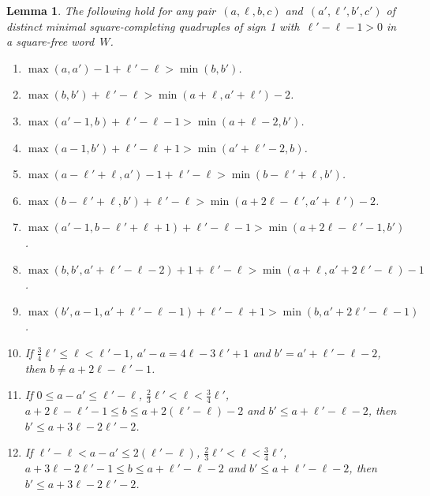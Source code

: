 \documentclass[12pt]{article}
\theoremstyle{plain}
\newtheorem{lemma}[theorem]{Lemma}
\theoremstyle{definition}
\begin{document}
	\begin{lemma} \label{lem:diff-length-mscq-outcomes}
		The following hold for any pair~$(a,\ell,b,c)$ and~$(a',\ell',b',c')$ of distinct minimal square-completing quadruples of sign 1 with~$\ell'-\ell-1>0$ in a square-free word~$W$.
		\begin{enumerate}
			\item \label{item:diff-length-mscq-left} $\max(a,a')-1 + \ell'-\ell > \min(b,b')$.
			\item \label{item:diff-length-mscq-right} $\max(b,b') + \ell'-\ell > \min(a+\ell,a'+\ell')-2$.
			\item \label{item:diff-length-mscq-mid} $\max(a'-1,b) + \ell'-\ell-1 > \min(a+\ell-2,b')$.
			\item \label{item:diff-length-mscq-mid-flip} $\max(a-1,b') + \ell'-\ell+1 > \min(a'+\ell'-2,b)$.
			\item \label{item:diff-length-mscq-shifted-left} $\max(a-\ell'+\ell,a')-1 + \ell'-\ell > \min(b-\ell'+\ell,b')$.
			\item \label{item:diff-length-mscq-shifted-right} $\max(b-\ell'+\ell,b') + \ell'-\ell > \min(a+2\ell-\ell',a'+\ell')-2$.
			\item \label{item:diff-length-mscq-shifted-mid} $\max(a'-1,b-\ell'+\ell+1) + \ell'-\ell-1 > \min(a+2\ell-\ell'-1,b')$.
			\item \label{item:diff-length-mscq-augmented-right} $\max(b,b',a'+\ell'-\ell-2)+1 + \ell'-\ell > \min(a+\ell,a'+2\ell'-\ell)-1$.
			\item \label{item:diff-length-mscq-augmented-mid} $\max(b',a-1,a'+\ell'-\ell-1) + \ell'-\ell+1 > \min(b,a'+2\ell'-\ell-1)$.
			\item \label{item:diff-length-mscq-edge} If $\frac{3}{4}\ell'\le \ell<\ell'-1$, $a'-a=4\ell-3\ell'+1$ and $b'=a'+\ell'-\ell-2$, then $b\ne a+2\ell-\ell'-1$. 
			\item \label{item:diff-length-mscq-bounce-A} If $0\le a-a'\le\ell'-\ell$, $\frac{2}{3}\ell'<\ell<\frac{3}{4}\ell'$, $a+2\ell-\ell'-1\le b\le a+2(\ell'-\ell)-2$ and $b'\le a+\ell'-\ell-2$, then $b'\le a+3\ell-2\ell'-2$.
			\item \label{item:diff-length-mscq-bounce-B} If $\ell'-\ell<a-a'\le2(\ell'-\ell)$, $\frac{2}{3}\ell'<\ell<\frac{3}{4}\ell'$, $a+3\ell-2\ell'-1\le b\le a+\ell'-\ell-2$ and $b'\le a+\ell'-\ell-2$, then $b'\le a+3\ell-2\ell'-2$.
		\end{enumerate}
	\end{lemma}
	
\end{document}
